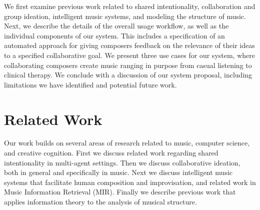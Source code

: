 \documentclass[final,authoryear,5p,times,twocolumn]{elsarticle}
\begin{document}
We first examine previous work related to shared intentionality, collaboration and group ideation, intelligent music systems, and modeling the structure of music. Next, we describe the details of the overall usage workflow, as well as the individual components of our system. This includes a specification of an automated approach for giving composers feedback on the relevance of their ideas to a specified collaborative goal. We present three use cases for our system, where collaborating composers create music ranging in purpose from casual listening to clinical therapy. We conclude with a discussion of our system proposal, including limitations we have identified and potential future work.



\section{Related Work}


Our work builds on several areas of research related to music, computer science, and creative cognition. First we discuss related work regarding shared intentionality in multi-agent settings. Then we discuss collaborative ideation, both in general and specifically in music. Next we discuss intelligent music systems that facilitate human composition and improvisation, and related work in Music Information Retrieval (MIR). Finally we describe previous work that applies information theory to the analysis of musical structure.
\end{document}
